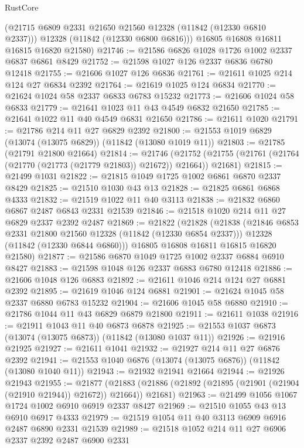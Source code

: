 \begin{lexlean}{RustCore}
\begin{coremodule}
        (@21715 @6809 @2331 @21650 @21560 @12328 (@11842 (@12330 @6810 @2337)))
        @12328
        (@11842 (@12330 @6800 @6816)))
      @16805
      @16808
      @16811
      @16815
      @16820
      @21580)
@21746 := @21586 @6826 @1028 @1726 @1002 @2337 @6837 @6861 @8429
@21752 := @21598 @1027 @126 @2337 @6836 @6780 @12418
@21755 := @21606 @1027 @126 @6836
@21761 := @21611 @1025 @214 @124 @27 @6834 @2392
@21764 := @21619 @1025 @124 @6834
@21770 := @21624 @1024 @58 @2337 @6833 @6783 @15232
@21773 := @21606 @1024 @58 @6833
@21779 := @21641 @1023 @11 @43 @4549 @6832 @21650
@21785 := @21641 @1022 @11 @40 @4549 @6831 @21650
@21786 := @21611 @1020
@21791 := @21786 @214 @11 @27 @6829 @2392
@21800 := @21553 @1019 @6829 (@13074 (@13075 @6829)) (@11842 (@13080 @1019 @11))
@21803 := @21785 (@21791 @21800 @21664)
@21814 := @21746
    (@21752 (@21755 (@21761 (@21764 (@21770 (@21773 (@21779 @21803)) @21672)) @21664)) @21681)
@21815 := @21499 @1031
@21822 := @21815 @1049 @1725 @1002 @6861 @6870 @2337 @8429
@21825 := @21510 @1030 @43 @13
@21828 := @21825 @6861 @6868 @4333
@21832 := @21519 @1022 @11 @40 @3113
@21838 := @21832 @6860 @6867 @2487 @6843 @2331 @21539
@21846 := @21518 @1020 @214 @11 @27 @6829 @2337 @2392 @2487
@21869 := @21822
    (@21828
      (@21838
        (@21846 @6853 @2331 @21800 @21560 @12328 (@11842 (@12330 @6854 @2337)))
        @12328
        (@11842 (@12330 @6844 @6860)))
      @16805
      @16808
      @16811
      @16815
      @16820
      @21580)
@21877 := @21586 @6870 @1049 @1725 @1002 @2337 @6884 @6910 @8427
@21883 := @21598 @1048 @126 @2337 @6883 @6780 @12418
@21886 := @21606 @1048 @126 @6883
@21892 := @21611 @1046 @214 @124 @27 @6881 @2392
@21895 := @21619 @1046 @124 @6881
@21901 := @21624 @1045 @58 @2337 @6880 @6783 @15232
@21904 := @21606 @1045 @58 @6880
@21910 := @21786 @1044 @11 @43 @6829 @6879 @21800
@21911 := @21611 @1038
@21916 := @21911 @1043 @11 @40 @6873 @6878
@21925 := @21553 @1037 @6873 (@13074 (@13075 @6873)) (@11842 (@13080 @1037 @11))
@21926 := @21916 @21925
@21927 := @21611 @1041
@21932 := @21927 @214 @11 @27 @6876 @2392
@21941 := @21553 @1040 @6876 (@13074 (@13075 @6876)) (@11842 (@13080 @1040 @11))
@21943 := @21932 @21941 @21664
@21944 := @21926 @21943
@21955 := @21877
    (@21883 (@21886 (@21892 (@21895 (@21901 (@21904 (@21910 @21944)) @21672)) @21664)) @21681)
@21963 := @21499 @1056 @1067 @1724 @1002 @6910 @6919 @2337 @8427
@21969 := @21510 @1055 @43 @13 @6910 @6917 @4333
@21979 := @21519 @1054 @11 @40 @3113 @6909 @6916 @2487 @6890 @2331 @21539
@21989 := @21518 @1052 @214 @11 @27 @6906 @2337 @2392 @2487 @6900 @2331

\end{coremodule}
\end{lexlean}

